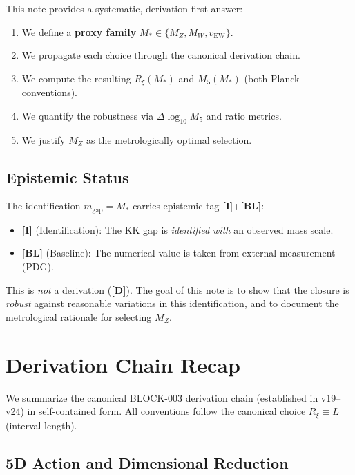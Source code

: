 \documentclass[11pt,a4paper]{article}
\newcommand{\Mfive}{M_5}
\newcommand{\Rxi}{R_\xi}
\newcommand{\mgap}{m_{\mathrm{gap}}}
\newcommand{\MZ}{M_Z}
\newcommand{\MW}{M_W}
\newcommand{\vEW}{v_{\mathrm{EW}}}
\newcommand{\Mstar}{M_*}
\newcommand{\tagD}{\textbf{[D]}}
\newcommand{\tagI}{\textbf{[I]}}
\newcommand{\tagBL}{\textbf{[BL]}}
\theoremstyle{definition}
\theoremstyle{plain}
\theoremstyle{remark}
\begin{document}
This note provides a systematic, derivation-first answer:
\begin{enumerate}
\item We define a \textbf{proxy family} $\Mstar \in \{\MZ, \MW, \vEW\}$.
\item We propagate each choice through the canonical derivation chain.
\item We compute the resulting $\Rxi(\Mstar)$ and $\Mfive(\Mstar)$ (both Planck conventions).
\item We quantify the robustness via $\Delta\log_{10}\Mfive$ and ratio metrics.
\item We justify $\MZ$ as the metrologically optimal selection.
\end{enumerate}

\subsection{Epistemic Status}

The identification $\mgap = \Mstar$ carries epistemic tag \tagI{}+\tagBL{}:
\begin{itemize}
\item \tagI{} (Identification): The KK gap is \emph{identified with} an observed mass scale.
\item \tagBL{} (Baseline): The numerical value is taken from external measurement (PDG).
\end{itemize}

This is \emph{not} a derivation (\tagD{}). The goal of this note is to show that
the closure is \emph{robust} against reasonable variations in this identification,
and to document the metrological rationale for selecting $\MZ$.

\section{Derivation Chain Recap}
\label{sec:derivation}

We summarize the canonical BLOCK-003 derivation chain (established in v19--v24)
in self-contained form. All conventions follow the canonical choice $\Rxi \equiv L$
(interval length).

\subsection{5D Action and Dimensional Reduction}
\end{document}
